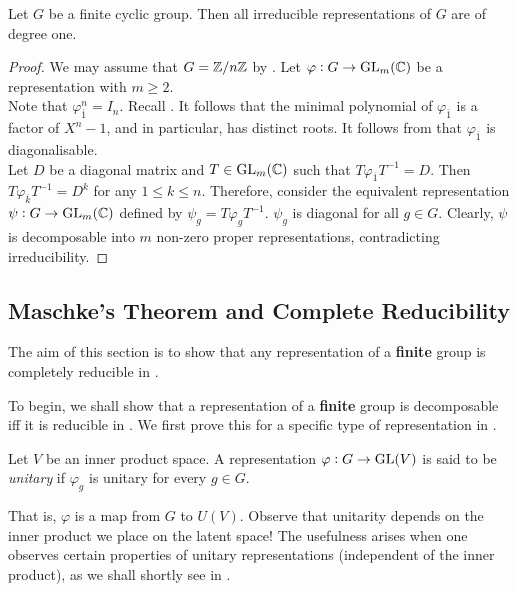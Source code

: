 			\begin{fprop}
				Let $G$ be a finite cyclic group. Then all irreducible representations of $G$ are of degree one.
			\end{fprop}
			\begin{proof}
				We may assume that $G = \mathbb{Z}/n\mathbb{Z}$ by . Let $\varphi : G \to \operatorname{GL}_m(\mathbb{C})$ be a representation with $m \ge 2$.\\
				Note that $\varphi_{\overline{1}}^n = I_n$. Recall . It follows that the minimal polynomial of $\varphi_{\overline{1}}$ is a factor of $X^n - 1$, and in particular, has distinct roots. It follows from  that $\varphi_{\overline{1}}$ is diagonalisable.\\
				Let $D$ be a diagonal matrix and $T \in \operatorname{GL}_m(\mathbb{C})$ such that $T\varphi_{\overline{1}}T^{-1} = D$.
				Then $T\varphi_{\overline{k}}T^{-1} = D^k$
				for any $1 \le k \le n$. Therefore, consider the equivalent representation $\psi : G \to \operatorname{GL}_m(\mathbb{C})$ defined by $\psi_g = T\varphi_g T^{-1}$. $\psi_g$ is diagonal for all $g \in G$. Clearly, $\psi$ is decomposable into $m$ non-zero proper representations, contradicting irreducibility.
			\end{proof}

	\subsection{Maschke's Theorem and Complete Reducibility}

			The aim of this section is to show that any representation of a \textbf{finite} group is completely reducible in .

			To begin, we shall show that a representation of a \textbf{finite} group is decomposable iff it is reducible in .
			We first prove this for a specific type of representation in .


			\begin{fdef}[Unitary]
				Let $V$ be an inner product space. A representation $\varphi : G \to \operatorname{GL}(V)$ is said to be \emph{unitary} if $\varphi_g$ is unitary for every $g \in G$.
			\end{fdef}

			That is, $\varphi$ is a map from $G$ to $U(V)$. Observe that unitarity depends on the inner product we place on the latent space! The usefulness arises when one observes certain properties of unitary representations (independent of the inner product), as we shall shortly see in .

